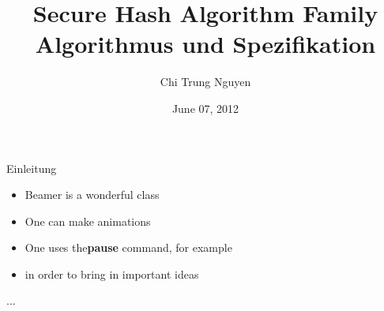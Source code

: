 \documentclass{beamer}
\title[SHA - Algorithmus und Spezifikation]{Secure Hash Algorithm Family\\Algorithmus und Spezifikation}
\author{Chi Trung Nguyen}
\institute{T-Systems}
\date{June 07, 2012}
\begin{document}
\begin{frame}
\titlepage
\end{frame}


\begin{frame}{Einleitung}
\begin{itemize}
\pause \item Beamer is a wonderful class
\pause \item One can make animations
\pause \item One uses the\textbf{pause} command, for example
\pause \item in order to bring in important ideas
\end{itemize}
\end{frame}

\begin{frame}
...
\end{frame}
\end{document}
